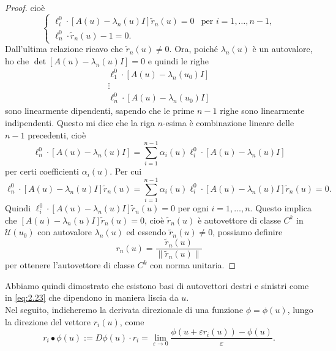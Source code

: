 \begin{proof}
    cioè 
    \begin{equation*}
        \begin{cases}
            \ell^{0}_{i}\cdot[A(u)-\lambda_{n}(u)I]\widetilde{r}_{n}(u)=0 & \text{per } i = 1,\ldots,n-1,\nonumber\\
            \ell_{n}^{0}\cdot\widetilde{r}_{n}(u)-1=0 .&
        \end{cases}
    \end{equation*}
    Dall'ultima relazione ricavo che $\widetilde{r}_{n}(u)\neq 0$.
    Ora, poiché $\lambda_{n}(u)$ è un autovalore, ho che $\det[A(u)-\lambda_{n}(u)I] = 0$ e quindi le righe 
    $$\begin{array}{cc}
      \ell^{0}_{1}\cdot[A(u)-\lambda_{n}(u_{0})I]\\
      \vdots \\
      \ell^{0}_{n}\cdot[A(u)-\lambda_{n}(u_{0})I]
    \end{array}$$
    sono linearmente dipendenti, sapendo che le prime $n-1$ righe sono linearmente indipendenti. Questo mi dice che la riga $n$-esima è combinazione lineare delle $n-1$ precedenti, cioè
    \begin{equation*}
        \ell^{0}_{n}\cdot[A(u)-\lambda_{n}(u)I] = \sum_{i=1}^{n-1}\alpha_{i}(u)\ell_{i}^{0}\cdot[A(u)-\lambda_{n}(u)I]
    \end{equation*}
    per certi coefficienti $\alpha_{i}(u)$. Per cui
    \begin{equation*}
        \ell^{0}_{n}\cdot[A(u)-\lambda_{n}(u)I]\widetilde{r}_{n}(u) = \sum_{i=1}^{n-1}\alpha_{i}(u)\ell_{i}^{0}\cdot[A(u)-\lambda_{n}(u)I]\widetilde{r}_{n}(u) = 0.
    \end{equation*}
    Quindi $\ell^{0}_{i}\cdot[A(u)-\lambda_{n}(u)I]\widetilde{r}_{n}(u) =0$ per ogni $i=1,\ldots,n$. Questo implica che $[A(u)-\lambda_{n}(u)I]\widetilde{r}_{n}(u)=0$, cioè $\widetilde{r}_{n}(u)$ è autovettore di classe $C^{k}$ in $\mathcal{U}(u_{0})$ con autovalore $\lambda_{n}(u)$ ed essendo $\widetilde{r}_{n}(u)\neq 0$, possiamo definire 
    \begin{equation*}
        r_{n}(u) = \frac{\widetilde{r}_{n}(u)}{\|\widetilde{r}_{n}(u)\|} 
    \end{equation*}
    per ottenere l'autovettore di classe $C^{k}$ con norma unitaria.
\end{proof}
Abbiamo quindi dimostrato che esistono basi di autovettori destri e sinistri come in \eqref{eq:2.23} che dipendono in maniera liscia da $u$.\\
Nel seguito, indicheremo la derivata direzionale di una funzione $\phi=\phi(u)$, lungo la direzione del vettore $r_{i}(u)$, come 
\begin{equation*}
    r_{i}\bullet\phi(u) := D\phi(u)\cdot r_{i}=\lim_{\varepsilon\rightarrow 0}\frac{\phi(u+\varepsilon r_{i}(u))-\phi(u)}{\varepsilon}.
\end{equation*}

